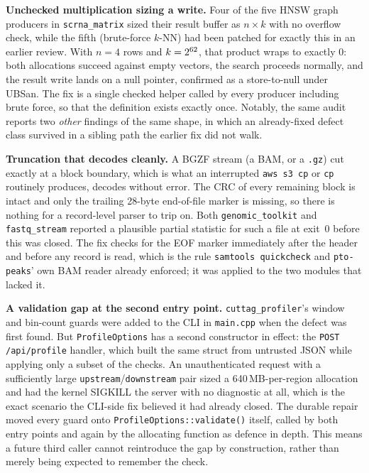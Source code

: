 \documentclass[10pt,twocolumn]{article}
\begin{document}
\textbf{Unchecked multiplication sizing a write.} Four of the five HNSW graph
producers in \texttt{scrna\_matrix} sized their result buffer as $n \times k$
with no overflow check, while the fifth (brute-force $k$-NN) had been patched
for exactly this in an earlier review. With $n=4$ rows and
$k=2^{62}{}$, that product wraps to exactly 0: both allocations
succeed against empty vectors, the search proceeds normally, and the result
write lands on a null pointer, confirmed as a store-to-null under UBSan. The
fix is a single checked helper called by every producer including brute
force, so that the definition exists exactly once. Notably, the same audit
reports two \emph{other} findings of the same shape, in which an already-fixed
defect class survived in a sibling path the earlier fix did not walk.

\textbf{Truncation that decodes cleanly.} A BGZF stream (a BAM, or a
\texttt{.gz}) cut exactly at a block boundary, which is what an interrupted
\texttt{aws s3 cp} or \texttt{cp} routinely produces, decodes without error.
The CRC of every remaining block is intact and only the trailing 28-byte
end-of-file marker is missing, so there is nothing for a record-level parser
to trip on. Both \texttt{genomic\_toolkit} and \texttt{fastq\_stream}
reported a plausible partial statistic for such a file at exit~0 before this
was closed. The fix checks for the EOF marker immediately after the header
and before any record is read, which is the rule \texttt{samtools quickcheck}
and \texttt{pto-peaks}' own BAM reader already enforced; it was applied to
the two modules that lacked it.

\textbf{A validation gap at the second entry point.}
\texttt{cuttag\_profiler}'s window and bin-count guards were added to the CLI
in \texttt{main.cpp} when the defect was first found. But
\texttt{ProfileOptions} has a second constructor in effect: the
\texttt{POST /api/profile} handler, which built the same struct from
untrusted JSON while applying only a subset of the checks. An unauthenticated
request with a sufficiently large \texttt{upstream}/\texttt{downstream} pair
sized a 640\,MB-per-region allocation and had the kernel SIGKILL the server
with no diagnostic at all, which is the exact scenario the CLI-side fix
believed it had already closed. The durable repair moved every guard onto
\texttt{ProfileOptions::validate()} itself, called by both entry points and
again by the allocating function as defence in depth. This means a future
third caller cannot reintroduce the gap by construction, rather than merely
being expected to remember the check.
\end{document}
